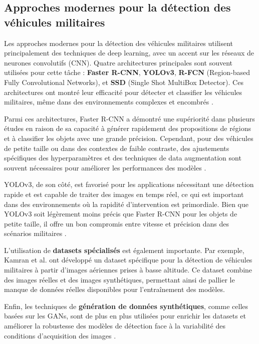 \subsection{Approches modernes pour la détection des véhicules militaires}

Les approches modernes pour la détection des véhicules militaires utilisent principalement des techniques de deep learning, avec un accent sur les réseaux de neurones convolutifs (CNN). Quatre architectures principales sont souvent utilisées pour cette tâche : \textbf{Faster R-CNN}, \textbf{YOLOv3}, \textbf{R-FCN} (Region-based Fully Convolutional Networks), et \textbf{SSD} (Single Shot MultiBox Detector). Ces architectures ont montré leur efficacité pour détecter et classifier les véhicules militaires, même dans des environnements complexes et encombrés \cite{kamran2020, gupta2021}.

Parmi ces architectures, Faster R-CNN a démontré une supériorité dans plusieurs études en raison de sa capacité à générer rapidement des propositions de régions et à classifier les objets avec une grande précision. Cependant, pour des véhicules de petite taille ou dans des contextes de faible contraste, des ajustements spécifiques des hyperparamètres et des techniques de data augmentation sont souvent nécessaires pour améliorer les performances des modèles \cite{gupta2021}.

YOLOv3, de son côté, est favorisé pour les applications nécessitant une détection rapide et est capable de traiter des images en temps réel, ce qui est important dans des environnements où la rapidité d'intervention est primordiale. Bien que YOLOv3 soit légèrement moins précis que Faster R-CNN pour les objets de petite taille, il offre un bon compromis entre vitesse et précision dans des scénarios militaires \cite{gupta2021}.

L'utilisation de \textbf{datasets spécialisés} est également importante. Par exemple, Kamran et al. \cite{kamran2020} ont développé un dataset spécifique pour la détection de véhicules militaires à partir d'images aériennes prises à basse altitude. Ce dataset combine des images réelles et des images synthétiques, permettant ainsi de pallier le manque de données réelles disponibles pour l'entraînement des modèles.

Enfin, les techniques de \textbf{génération de données synthétiques}, comme celles basées sur les GANs, sont de plus en plus utilisées pour enrichir les datasets et améliorer la robustesse des modèles de détection face à la variabilité des conditions d'acquisition des images \cite{spie2020}.


